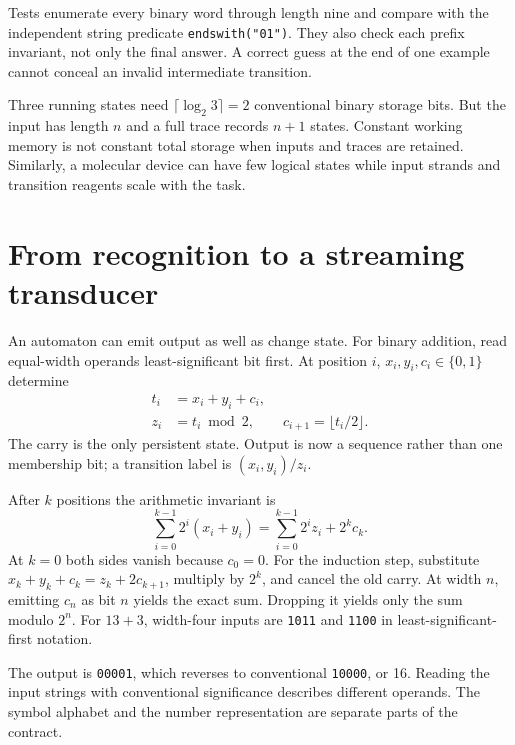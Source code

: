 Tests enumerate every binary word through length nine and compare with the
independent string predicate \texttt{endswith("01")}. They also check each
prefix invariant, not only the final answer. A correct guess at the end of one
example cannot conceal an invalid intermediate transition.

Three running states need $\lceil\log_2 3\rceil=2$ conventional binary storage
bits. But the input has length $n$ and a full trace records $n+1$ states.
Constant working memory is not constant total storage when inputs and traces
are retained. Similarly, a molecular device can have few logical states while
input strands and transition reagents scale with the task.

\section{From recognition to a streaming transducer}
An automaton can emit output as well as change state. For binary addition,
read equal-width operands least-significant bit first. At position $i$,
$x_i,y_i,c_i\in\{0,1\}$ determine
\begin{align}
 t_i&=x_i+y_i+c_i,\\
 z_i&=t_i\bmod 2,\qquad c_{i+1}=\lfloor t_i/2\rfloor.
 \label{eq:carry}
\end{align}
The carry is the only persistent state. Output is now a sequence rather than
one membership bit; a transition label is $(x_i,y_i)/z_i$.

After $k$ positions the arithmetic invariant is
\begin{equation}
 \sum_{i=0}^{k-1}2^i(x_i+y_i)
 =
 \sum_{i=0}^{k-1}2^i z_i+2^k c_k.
 \label{eq:addinv}
\end{equation}
At $k=0$ both sides vanish because $c_0=0$. For the induction step, substitute
$x_k+y_k+c_k=z_k+2c_{k+1}$, multiply by $2^k$, and cancel the old carry.
At width $n$, emitting $c_n$ as bit $n$ yields the exact sum. Dropping it yields
only the sum modulo $2^n$.
For $13+3$, width-four inputs are \texttt{1011} and \texttt{1100}
in least-significant-first notation.
\begin{center}\end{center}
The output is \texttt{00001}, which reverses to conventional \texttt{10000},
or 16. Reading the input strings with conventional significance describes
different operands. The symbol alphabet and the number representation are
separate parts of the contract.

